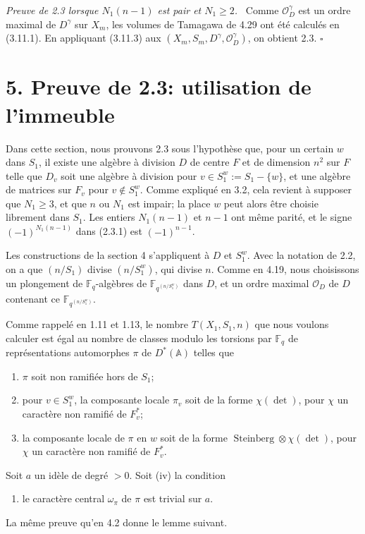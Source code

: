 \documentclass[10pt]{article}
\newcommand{\Fq}{\mathbb F_q}
\newcommand{\Adele}{\mathbb A}
\newcommand{\OD}{\mathcal O_D}
\theoremstyle{deligne}
\newenvironment{proofdel}[1][Preuve.]{\textit{#1}\ }{\hfill$\square$}
\newcommand{\Stein}{\operatorname{Steinberg}}
\newcommand{\heading}[1]{\vspace{0.7em}\noindent{\bfseries #1}\quad}
\begin{document}
\begin{proofdel}[Preuve de 2.3 lorsque $N_1(n-1)$ est pair et $N_1\ge2$.]
Comme $\OD^\gamma$ est un ordre maximal de $D^\gamma$ sur $X_m$, les volumes de Tamagawa de 4.29 ont été calculés en (3.11.1). En appliquant (3.11.3) aux $(X_m,S_m,D^\gamma,\OD^\gamma)$, on obtient 2.3.
\end{proofdel}

\section*{5. Preuve de 2.3: utilisation de l'immeuble}

Dans cette section, nous prouvons 2.3 sous l'hypothèse que, pour un certain $w$ dans $S_1$, il existe une algèbre à division $D$ de centre $F$ et de dimension $n^2$ sur $F$ telle que $D_v$ soit une algèbre à division pour $v\in S_1^w:=S_1-\{w\}$, et une algèbre de matrices sur $F_v$ pour $v\notin S_1^w$. Comme expliqué en 3.2, cela revient à supposer que $N_1\ge3$, et que $n$ ou $N_1$ est impair; la place $w$ peut alors être choisie librement dans $S_1$. Les entiers $N_1(n-1)$ et $n-1$ ont même parité, et le signe $(-1)^{N_1(n-1)}$ dans (2.3.1) est $(-1)^{n-1}$.

Les constructions de la section 4 s'appliquent à $D$ et $S_1^w$. Avec la notation de 2.2, on a que $(n/S_1)$ divise $(n/S_1^w)$, qui divise $n$. Comme en 4.19, nous choisissons un plongement de $\Fq$-algèbres de $\mathbb F_{q^{(n/S_1^w)}}$ dans $D$, et un ordre maximal $\OD$ de $D$ contenant ce $\mathbb F_{q^{(n/S_1^w)}}$.

\heading{5.1.} Comme rappelé en 1.11 et 1.13, le nombre $T(X_1,S_1,n)$ que nous voulons calculer est égal au nombre de classes modulo les torsions par $\Fq$ de représentations automorphes $\pi$ de $D^*(\Adele)$ telles que
\begin{enumerate}[label=(\roman*)]
\item $\pi$ soit non ramifiée hors de $S_1$;
\item pour $v\in S_1^w$, la composante locale $\pi_v$ soit de la forme $\chi(\det)$, pour $\chi$ un caractère non ramifié de $F_v^*$;
\item la composante locale de $\pi$ en $w$ soit de la forme $\Stein\otimes\chi(\det)$, pour $\chi$ un caractère non ramifié de $F_v^*$.
\end{enumerate}
Soit $a$ un id\`ele de degré $>0$. Soit (iv) la condition
\begin{enumerate}[label=(\roman*),start=4]
\item le caractère central $\omega_\pi$ de $\pi$ est trivial sur $a$.
\end{enumerate}
La même preuve qu'en 4.2 donne le lemme suivant.
\end{document}
